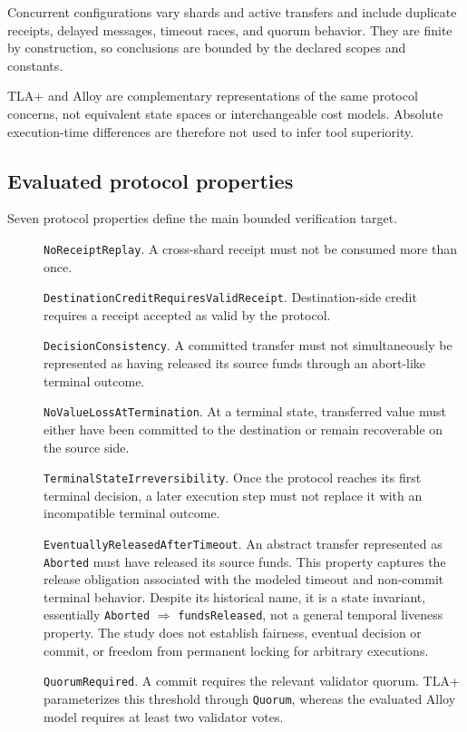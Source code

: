 Concurrent configurations vary shards and active transfers and include
duplicate receipts, delayed messages, timeout races, and quorum behavior. They
are finite by construction, so conclusions are bounded by the declared scopes
and constants.

TLA+ and Alloy are complementary representations of the same protocol concerns,
not equivalent state spaces or interchangeable cost models. Absolute
execution-time differences are therefore not used to infer tool superiority.

\subsection{Evaluated protocol properties}
\label{subsec:properties}

Seven protocol properties define the main bounded verification target.

\begin{description}

\item[] \texttt{NoReceipt\allowbreak Replay}.
A cross-shard receipt must not be consumed more than once.

\item[] \texttt{DestinationCreditRequires\allowbreak ValidReceipt}.
Destination-side credit requires a receipt accepted as valid by the protocol.

\item[] \texttt{Decision\allowbreak Consistency}.
A committed transfer must not simultaneously be represented as having released
its source funds through an abort-like terminal outcome.

\item[] \texttt{NoValueLossAt\allowbreak Termination}.
At a terminal state, transferred value must either have been committed to the
destination or remain recoverable on the source side.

\item[] \texttt{TerminalState\allowbreak Irreversibility}.
Once the protocol reaches its first terminal decision, a later execution step
must not replace it with an incompatible terminal outcome.

\item[] \texttt{EventuallyReleasedAfter\allowbreak Timeout}.
An abstract transfer represented as \texttt{Aborted} must have released its
source funds. This property captures the release obligation associated with the
modeled timeout and non-commit terminal behavior.
Despite its historical name, it is a state invariant, essentially
\texttt{Aborted} $\Rightarrow$ \texttt{fundsReleased}, not a general temporal
liveness property. The study does not establish fairness, eventual decision
or commit, or freedom from permanent locking for arbitrary executions.

\item[] \texttt{Quorum\allowbreak Required}.
A commit requires the relevant validator quorum. TLA+ parameterizes this
threshold through \texttt{Quorum}, whereas the evaluated Alloy model requires at
least two validator votes.

\end{description}


